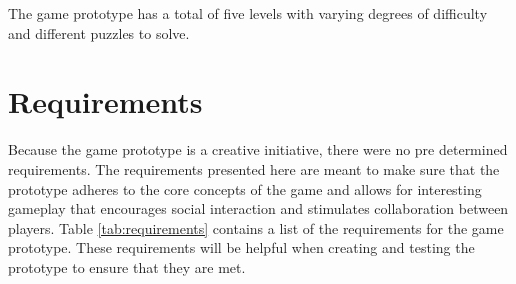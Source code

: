 The game prototype has a total of five levels with varying degrees of difficulty and different puzzles to solve.



\section{Requirements}
Because the game prototype is a creative initiative, there were no pre determined requirements. The requirements presented here are meant to make sure that the prototype adheres to the core concepts of the game and allows for interesting gameplay that encourages social interaction and stimulates collaboration between players. Table \ref{tab:requirements} contains a list of the requirements for the game prototype. These requirements will be helpful when creating and testing the prototype to ensure that they are met.

